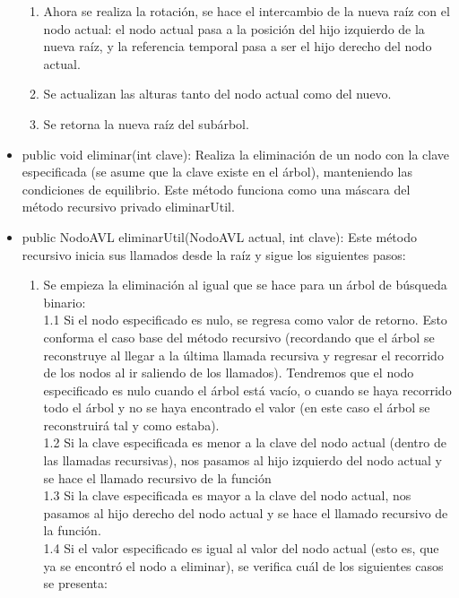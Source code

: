 \documentclass{article}
\begin{document}
\begin{itemize}
\begin{enumerate}
\item Ahora se realiza la rotación, se hace el intercambio de la nueva raíz con el nodo actual: el nodo actual pasa a la posición del hijo izquierdo de la nueva raíz, y la referencia temporal pasa a ser el hijo derecho del nodo actual.
\item Se actualizan las alturas tanto del nodo actual como del nuevo.
\item Se retorna la nueva raíz del subárbol.
\end{enumerate}
\item public void eliminar(int clave):  Realiza la eliminación de un nodo con la clave especificada (se asume que la clave existe en el árbol), manteniendo las condiciones de equilibrio. Este método funciona como una máscara del método recursivo privado eliminarUtil. 
\item public NodoAVL eliminarUtil(NodoAVL actual, int clave): Este método recursivo inicia sus llamados desde la raíz y sigue los siguientes pasos:
\begin{enumerate}
\item Se empieza la eliminación al igual que se hace para un árbol de búsqueda binario:\\

            1.1 Si el nodo especificado es nulo, se regresa como valor de retorno. Esto conforma el caso base del método recursivo (recordando que el árbol se reconstruye al llegar a la última llamada recursiva y regresar el recorrido de los nodos al ir saliendo de los llamados). Tendremos que el nodo especificado es nulo cuando el árbol está vacío, o cuando se haya recorrido todo el árbol y no se haya encontrado el valor (en este caso el árbol se reconstruirá tal y como estaba). \\
            
            1.2 Si la clave especificada es menor a la clave del nodo actual (dentro de las llamadas recursivas), nos pasamos al hijo izquierdo del nodo actual y se hace el llamado recursivo de la función\\

            1.3 Si la clave especificada es mayor a la clave del nodo actual, nos pasamos al hijo derecho del nodo actual y se hace el llamado recursivo de la función.\\
            
            1.4 Si el valor especificado es igual al valor del nodo actual (esto es, que ya se encontró el nodo a eliminar), se verifica cuál de los siguientes casos se presenta:\\
            

\end{enumerate}
\end{itemize}
\end{document}
